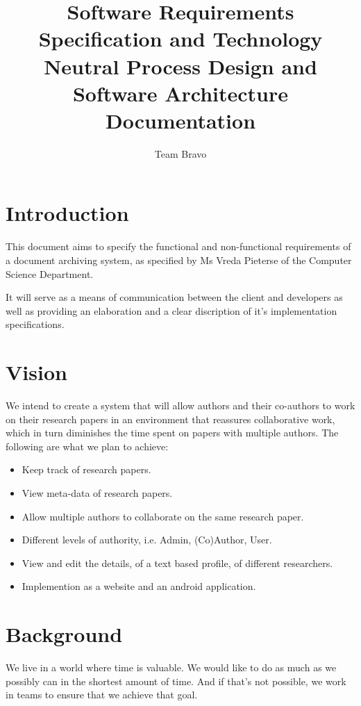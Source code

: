 \documentclass[11pt]{article}
\author{Team Bravo}
\title{Software Requirements Specification and Technology Neutral Process Design and Software Architecture Documentation}
\begin{document}
	\setlength{\parskip}{6pt}
	
	
	
	\renewcommand{\thesection}{\arabic{section}}
	\newpage
	
	\tableofcontents
	
	\section{Introduction}
	
	This document aims to specify the functional and non-functional requirements of a document archiving system, as specified by Ms Vreda Pieterse of the Computer Science Department.
	
	It will serve as a means of communication between the client and developers as well as providing an elaboration and a clear discription of it's implementation specifications.
	
	\section{Vision}
	
	We intend to create a system that will allow authors and their co-authors to work on their research papers in an environment that reassures collaborative work, which in turn diminishes the time spent on papers with multiple authors. The following are what we plan to achieve:
	
	\begin{itemize}
		\item Keep track of research papers.
		\item View meta-data of research papers.
		\item Allow multiple authors to collaborate on the same research paper.
		\item Different levels of authority, i.e. Admin, (Co)Author, User.
		\item View and edit the details, of a text based profile, of different researchers.
		\item Implemention as a website and an android application.
	\end{itemize}
	
	\section{Background}
	
	We live in a world where time is valuable. We would like to do as much as we possibly can in the shortest amount of time. And if that's not possible, we work in teams to ensure that we achieve that goal.
	
\end{document}
